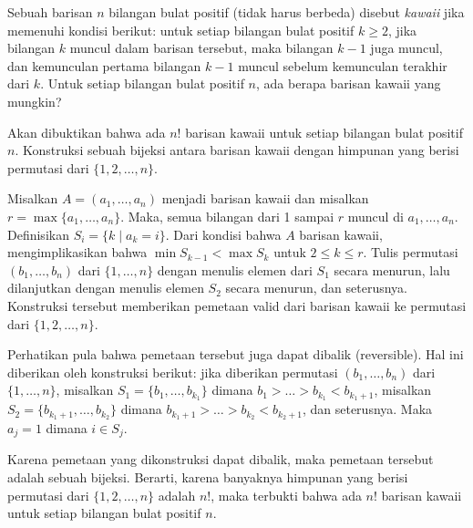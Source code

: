 \documentclass[12pt]{scrartcl}
\begin{document}
\begin{soaljawab}
    Sebuah barisan $n$ bilangan bulat positif (tidak harus berbeda) disebut \textit{kawaii} jika memenuhi kondisi berikut: untuk setiap bilangan bulat positif $k \ge 2$, jika bilangan $k$ muncul dalam barisan tersebut, maka bilangan $k-1$ juga muncul, dan kemunculan pertama bilangan $k-1$ muncul sebelum kemunculan terakhir dari $k$. Untuk setiap bilangan bulat positif $n$, ada berapa barisan kawaii yang mungkin?
    \begin{solusi}
        Akan dibuktikan bahwa ada $n!$ barisan kawaii untuk setiap bilangan bulat positif $n$. Konstruksi sebuah bijeksi antara barisan kawaii dengan himpunan yang berisi permutasi dari $\{1,2,\dots,n\}$.

        Misalkan $A=(a_1, \dots, a_n)$ menjadi barisan kawaii dan misalkan $r = \max\{a_1, \dots, a_n\}$. Maka, semua bilangan dari 1 sampai $r$ muncul di $a_1, \dots, a_n$. Definisikan $S_i = \{k \mid a_k = i\}$. Dari kondisi bahwa $A$ barisan kawaii, mengimplikasikan bahwa $\min S_{k-1} < \max S_k$ untuk $2 \le k \le r$. Tulis permutasi $(b_1, \dots, b_n)$ dari $\{1,\dots,n\}$ dengan menulis elemen dari $S_1$ secara menurun, lalu dilanjutkan dengan menulis elemen $S_2$ secara menurun, dan seterusnya. Konstruksi tersebut memberikan pemetaan valid dari barisan kawaii ke permutasi dari $\{1,2,\dots,n\}$.

        Perhatikan pula bahwa pemetaan tersebut juga dapat dibalik (reversible). Hal ini diberikan oleh konstruksi berikut: jika diberikan permutasi $(b_1, \dots, b_n)$ dari $\{1,\dots,n\}$, misalkan $S_1 =  \{b_1,\dots,b_{k_1}\}$ dimana $b_1 > \dots >  b_{k_1} < b_{k_1+1}$, misalkan $S_2 =  \{b_{k_1+1},\dots,b_{k_2}\}$ dimana $b_{k_1+1} > \dots >  b_{k_2} < b_{k_2+1}$, dan seterusnya. Maka $a_j = 1$ dimana $i \in S_j$.

        Karena pemetaan yang dikonstruksi dapat dibalik, maka pemetaan tersebut adalah sebuah bijeksi. Berarti, karena banyaknya himpunan yang berisi permutasi dari $\{1,2,\dots,n\}$ adalah $n!$, maka terbukti bahwa ada $n!$ barisan kawaii untuk setiap bilangan bulat positif $n$.
    \end{solusi}
\end{soaljawab}
\end{document}
